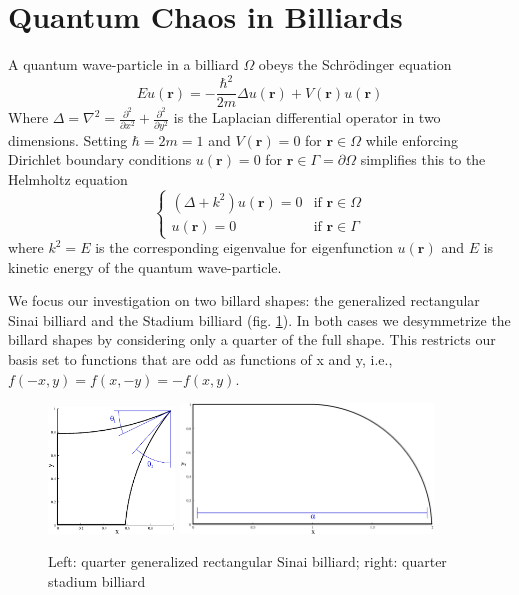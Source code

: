 \documentclass{report}
\newcommand{\rr}[0]{\mathbf{r}}
\begin{document}
\section{Quantum Chaos in Billiards}
\label{sec:billiards}
A quantum wave-particle in a billiard $\Omega$ obeys the Schr\"odinger equation
\[
E u(\rr) = - \frac{\hbar^{2}}{2m} \Delta u(\rr) + V(\rr) u(\rr)
\]
Where $\Delta = \nabla^{2} = \frac{\partial^{2}}{\partial x^{2}} + \frac{\partial^{2}}{\partial y^{2}}$ is the Laplacian differential operator in two dimensions. Setting $\hbar = 2m = 1$ and $V(\rr) = 0$ for $\rr \in \Omega$ while enforcing Dirichlet boundary conditions $u(\rr) = 0$ for $\rr \in \Gamma = \partial \Omega$ simplifies this to the Helmholtz equation
\begin{equation}
\label{eq:helmholtz}
\begin{cases}
(\Delta + k^{2})u(\rr) = 0 & \text{if } \rr \in \Omega\\
  u(\rr) = 0 & \text{if } \rr \in \Gamma
\end{cases}
\end{equation}
where $k^{2} = E$ is the corresponding eigenvalue for eigenfunction $u(\rr)$ and $E$ is kinetic energy of the quantum wave-particle.

We focus our investigation on two billard shapes: the generalized rectangular Sinai billiard and the Stadium billiard (fig. \ref{fig:billiards}). In both cases we desymmetrize the billard shapes by considering only a quarter of the full shape. This restricts our basis set to functions that are odd as functions of x and y, i.e., $f(-x,y) = f(x,-y) = -f(x,y)$.

\begin{figure}
  \begin{center}
    \includegraphics[width=0.3\textwidth]{figs/domains/qugrs_fig.eps}
    \includegraphics[width=0.6\textwidth]{figs/domains/qust_fig.eps}
    \caption{Left: quarter generalized rectangular Sinai billiard; right: quarter stadium billiard}
    \label{fig:billiards}
  \end{center}
\end{figure}
\end{document}
